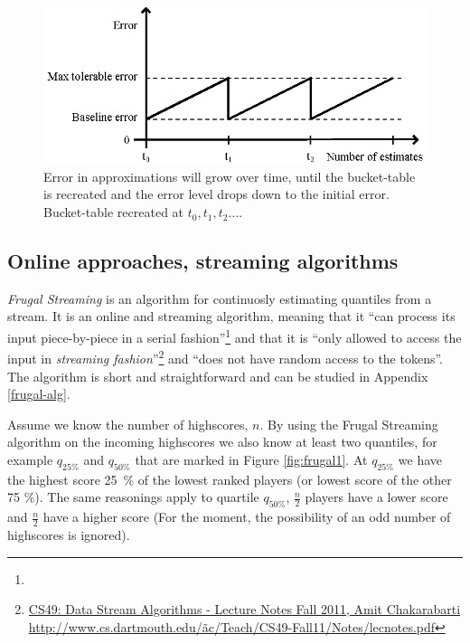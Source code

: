 \begin{figure}[h]
  \centering
  \caption{Error in approximations will grow over time, until the bucket-table is recreated and the error level drops down to the initial error. Bucket-table recreated at $t_0, t_1, t_2 \dots$. 
  }
  \label{fig:errortime}
  \includegraphics[width=13cm]{img/error-over-time.eps}
\end{figure}
\newpage

\subsection{\label{frugal}Online approaches, streaming algorithms}

\emph{Frugal Streaming}\cite{frugal_streaming} is an algorithm for continuosly estimating quantiles from a stream. It is an online and streaming algorithm, meaning that it ``can process its input piece-by-piece in a serial fashion''\footnote{} and that it is ``only allowed to access the input in \emph{streaming fashion}''\footnote{\href{http://www.cs.dartmouth.edu/\~ac/Teach/CS49-Fall11/Notes/lecnotes.pdf}{CS49: Data Stream Algorithms - Lecture Notes Fall 2011, Amit Chakarabarti\\http://www.cs.dartmouth.edu/\~ac/Teach/CS49-Fall11/Notes/lecnotes.pdf}\label{fn}} and ``does not have random access to the tokens''. The algorithm is short and straightforward and can be studied in Appendix \ref{frugal-alg}.

Assume we know the number of highscores, $n$. By using the Frugal Streaming algorithm on the incoming highscores we also know at least two quantiles, for example $q_{25\%}$ and $q_{50\%}$ that are marked in Figure \ref{fig:frugal1}. At $q_{25\%}$ we have the highest score \mbox{25 \%} of the lowest ranked players (or lowest score of the other 75 \%). The same reasonings apply to quartile $q_{50\%}$, $\frac{n}{2}$ players have a lower score and $\frac{n}{2}$ have a higher score (For the moment, the possibility of an odd number of highscores is ignored).

